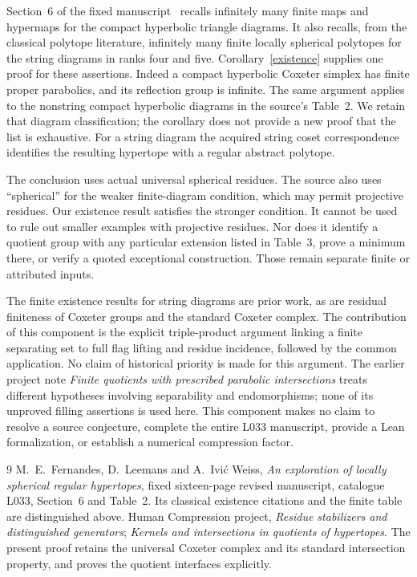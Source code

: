 \documentclass[11pt,a4paper]{article}
\begin{document}
Section~6 of the fixed manuscript~\cite{source} recalls infinitely
many finite maps and hypermaps for the compact hyperbolic triangle
diagrams. It also recalls, from the classical polytope literature,
infinitely many finite locally spherical polytopes for the string
diagrams in ranks four and five. Corollary~\ref{existence} supplies
one proof for these assertions. Indeed a compact hyperbolic Coxeter
simplex has finite proper parabolics, and its reflection group is
infinite. The same argument applies to the nonstring compact
hyperbolic diagrams in the source's Table~2. We retain that diagram
classification; the corollary does not provide a new proof that the
list is exhaustive. For a string diagram the acquired string
coset correspondence identifies the resulting hypertope with a
regular abstract polytope.

The conclusion uses actual universal spherical residues. The source
also uses ``spherical'' for the weaker finite-diagram condition,
which may permit projective residues. Our existence result satisfies
the stronger condition. It cannot be used to rule out smaller
examples with projective residues. Nor does it identify a quotient
group with any particular extension listed in Table~3, prove a
minimum there, or verify a quoted exceptional construction. Those
remain separate finite or attributed inputs.

The finite existence results for string diagrams are prior work,
as are residual finiteness of Coxeter groups and the standard
Coxeter complex. The contribution of this component is the explicit
triple-product argument linking a finite separating set to full flag
lifting and residue incidence, followed by the common application.
No claim of historical priority is made for this argument. The
earlier project note \emph{Finite quotients with prescribed parabolic
intersections} treats different hypotheses involving separability
and endomorphisms; none of its unproved filling assertions is used
here. This component makes no claim to resolve a source conjecture,
complete the entire L033 manuscript, provide a Lean formalization,
or establish a numerical compression factor.

\begin{thebibliography}{9}
 M.~E.~Fernandes, D.~Leemans and A.~Ivi\'c Weiss,
\emph{An exploration of locally spherical regular hypertopes},
fixed sixteen-page revised manuscript, catalogue L033,
Section~6 and Table~2. Its classical existence citations and the
finite table are distinguished above.
 Human Compression project,
\emph{Residue stabilizers and distinguished generators};
\emph{Kernels and intersections in quotients of hypertopes}.
The present proof retains the universal Coxeter complex and its
standard intersection property, and proves the quotient interfaces
explicitly.
\end{thebibliography}
\end{document}
